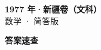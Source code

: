 \documentclass[zihao=-4, a4paper]{ctexart}
\begin{document}
\begin{center}
  {\Large\bfseries 1977 年·新疆卷（文科）}\\[4pt]
  {\large 数学 · 简答版}
\end{center}
\medskip
{}

\clearpage
{}
\begin{center}{\Large\bfseries 答案速查}\end{center}
\medskip

\end{document}
